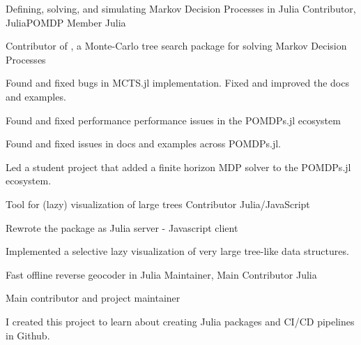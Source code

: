 

\begin{cventries}

  \cventry
    {Defining, solving, and simulating Markov Decision Processes in Julia} %
    {
    } %
    {Contributor, JuliaPOMDP Member} %
    {Julia} %
    {
      \begin{cvitems} %
        \item {Contributor of , a Monte-Carlo tree search package for solving Markov Decision Processes}
        \item {Found and fixed bugs in MCTS.jl implementation. Fixed and improved the docs and examples.}
        \item {Found and fixed performance performance issues in the POMDPs.jl ecosystem}
        \item {Found and fixed issues in docs and examples across POMDPs.jl.}
        \item {Led a student project that added a finite horizon MDP solver to the POMDPs.jl ecosystem.}
      \end{cvitems}
    }
    
  \cventry
    {Tool for (lazy) visualization of large trees} %
    {} %
    {Contributor} %
    {Julia/JavaScript} %
    {
      \begin{cvitems} %
        \item{Rewrote the package as Julia server - Javascript client}
        \item{Implemented a selective lazy visualization of very large tree-like data structures.}
      \end{cvitems}
    }

  \cventry
    {Fast offline reverse geocoder in Julia} %
    {} %
    {Maintainer, Main Contributor} %
    {Julia} %
    {
      \begin{cvitems} %
        \item {Main contributor and project maintainer}
        \item {I created this project to learn about creating Julia packages and CI/CD pipelines in Github.}
      \end{cvitems}
    }


\end{cventries}
